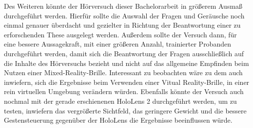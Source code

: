 Des Weiteren könnte der Hörversuch dieser Bachelorarbeit in größerem Ausmaß durchgeführt werden. Hierfür sollte die Auswahl der Fragen und Geräusche noch einmal genauer überdacht und gezielter in Richtung der Beantwortung einer zu erforschenden These ausgelegt werden. Außerdem sollte der Versuch dann, für eine bessere Aussagekraft, mit einer größeren Anzahl, trainierter Probanden durchgeführt werden, damit sich die Beantwortung der Fragen ausschließlich auf die Inhalte des Hörversuchs bezieht und nicht auf das allgemeine Empfinden beim Nutzen einer Mixed-Reality-Brille. Interessant zu beobachten wäre zu dem auch inwiefern, sich die Ergebnisse beim Verwenden einer Vitual Reality-Brille, in einer rein virtuellen Umgebung verändern würden. Ebenfalls könnte der Versuch  auch nochmal mit der gerade erschienenen HoloLens 2 durchgeführt werden, um zu testen, inwiefern das vergrößerte Sichtfeld, das geringere Gewicht und die bessere Gestensteuerung gegenüber der HoloLens die Ergebnisse beeinflussen würde. 









